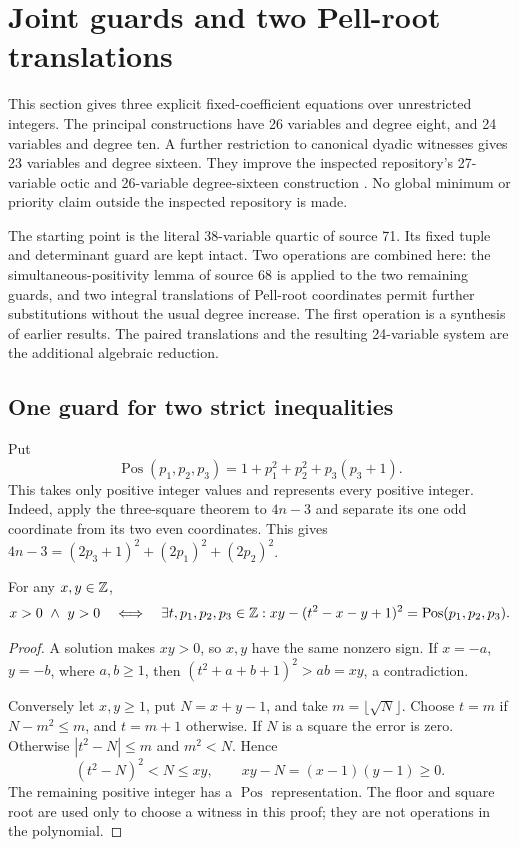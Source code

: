 \section{Joint guards and two Pell-root translations}
\label{sec:integer-new}

This section gives three explicit fixed-coefficient equations over unrestricted
integers.  The principal constructions have 26 variables and degree eight,
and 24 variables and degree ten.  A further restriction to canonical dyadic
witnesses gives 23 variables and degree sixteen.  They improve the inspected
repository's 27-variable octic and 26-variable degree-sixteen construction
\cite{source68,source71}.  No global minimum or priority claim outside the
inspected repository is made.

The starting point is the literal 38-variable quartic of source 71.  Its
fixed tuple and determinant guard are kept intact.  Two operations are
combined here: the simultaneous-positivity lemma of source 68 is applied
to the two remaining guards, and two integral translations of Pell-root
coordinates permit further substitutions without the usual degree increase.
The first operation is a synthesis of earlier results.  The paired
translations and the resulting 24-variable system are the additional
algebraic reduction.

\subsection{One guard for two strict inequalities}

Put
\[
 \operatorname{Pos}(p_1,p_2,p_3)
   =1+p_1^2+p_2^2+p_3(p_3+1).
\]
This takes only positive integer values and represents every positive
integer.  Indeed, apply the three-square theorem to $4n-3$ and separate its
one odd coordinate from its two even coordinates.  This gives
$4n-3=(2p_3+1)^2+(2p_1)^2+(2p_2)^2$.

\begin{lemma}
\label{lem:int-pair}
For any $x,y\in\mathbb Z$,
\[
 x>0\ \land\ y>0
 \quad\Longleftrightarrow\quad
 \exists t,p_1,p_2,p_3\in\mathbb Z:
 xy-(t^2-x-y+1)^2=\operatorname{Pos}(p_1,p_2,p_3).
\]
\end{lemma}
\begin{proof}
A solution makes $xy>0$, so $x,y$ have the same nonzero sign.  If
$x=-a$, $y=-b$, where $a,b\ge1$, then
$(t^2+a+b+1)^2>ab=xy$, a contradiction.

Conversely let $x,y\ge1$, put $N=x+y-1$, and take
$m=\lfloor\sqrt N\rfloor$.  Choose $t=m$ if $N-m^2\le m$, and
$t=m+1$ otherwise.  If $N$ is a square the error is zero.  Otherwise
$|t^2-N|\le m$ and $m^2<N$.  Hence
\[
 (t^2-N)^2<N\le xy,
 \qquad xy-N=(x-1)(y-1)\ge0.
\]
The remaining positive integer has a $\operatorname{Pos}$ representation.
The floor and square root are used only to choose a witness in this proof;
they are not operations in the polynomial.
\end{proof}

